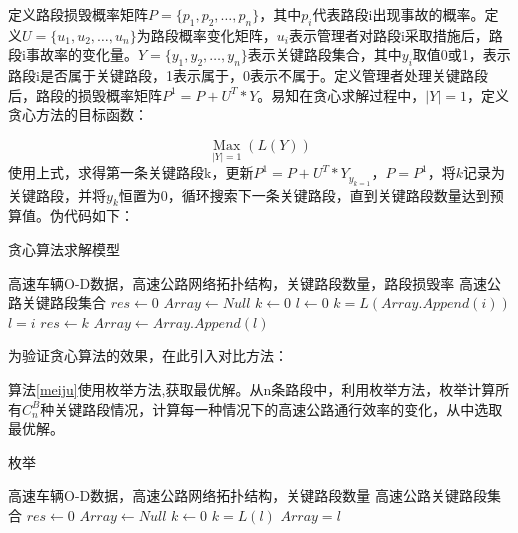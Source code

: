 			定义路段损毁概率矩阵$P=\{p_1,p_2,\dots,p_n\}$，其中$p_i$代表路段i出现事故的概率。定义$U=\{u_1,u_2,\dots,u_n\}$为路段概率变化矩阵，$u_i$表示管理者对路段i采取措施后，路段i事故率的变化量。$Y=\{y_1,y_2,\dots,y_n\}$表示关键路段集合，其中$y_i$取值0或1，表示路段i是否属于关键路段，1表示属于，0表示不属于。定义管理者处理关键路段后，路段的损毁概率矩阵$P^1=P+U^T*Y$。易知在贪心求解过程中，$|Y|=1$，定义贪心方法的目标函数：

				$$\mathop{Max}\limits_{|Y|=1} (L(Y))$$
			使用上式，求得第一条关键路段k，更新$P^1=P+U^T*Y_{y_{k=1}}$，$P=P^1$，将$k$记录为关键路段，并将$y_k$恒置为0，循环搜索下一条关键路段，直到关键路段数量达到预算值。伪代码如下：

		\begin{algorithm}[h]
        \caption{贪心算法求解模型}  
        \label{tanxin}
        \begin{algorithmic}[1] %
            \Require 高速车辆O-D数据，高速公路网络拓扑结构，关键路段数量，路段损毁率
            \Ensure 高速公路关键路段集合
                \State $res\gets 0$  
                \State $Array\gets Null$  
                \State $k\gets 0$  
                \State $l\gets 0$  
                        	\State $k=L(Array.Append(i))$  
                        	\State $l=i$  
                    	\EndIf
                	\EndFor    
                    \State $res\gets k$
                    \State $Array\gets Array.Append(l)$
                \EndWhile  
                \State {}  
            \EndFunction  
        \end{algorithmic}  
    	\end{algorithm} 

    	为验证贪心算法的效果，在此引入对比方法：

    	算法\ref{meiju}使用枚举方法,获取最优解。从n条路段中，利用枚举方法，枚举计算所有$C_n^B$种关键路段情况，计算每一种情况下的高速公路通行效率的变化，从中选取最优解。

    	\begin{algorithm}[!h]
        \caption{枚举} 
        \label{meiju} 
        \begin{algorithmic}[1] %
            \Require 高速车辆O-D数据，高速公路网络拓扑结构，关键路段数量
            \Ensure 高速公路关键路段集合
                \State $res\gets 0$  
                \State $Array\gets Null$  
                \State $k\gets 0$ 
                        	\State $k=L(l)$  
                        	\State $Array=l$  
                    	\EndIf
                	\EndFor  
                \State {}  
            \EndFunction  
        \end{algorithmic}  
    	\end{algorithm} 

